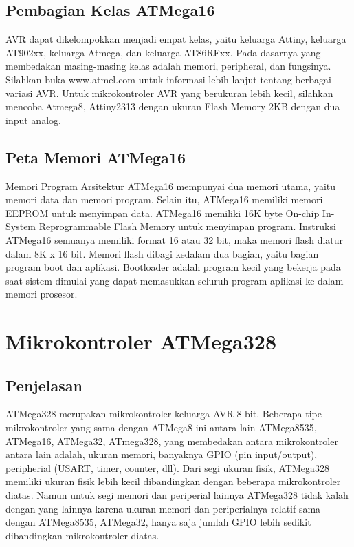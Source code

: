 	\subsection{Pembagian Kelas ATMega16}
		AVR dapat dikelompokkan menjadi empat kelas, yaitu keluarga Attiny, keluarga AT902xx, keluarga Atmega, dan keluarga AT86RFxx. Pada dasarnya yang membedakan masing-masing kelas adalah memori, peripheral, dan fungsinya. Silahkan buka www.atmel.com untuk informasi lebih lanjut tentang berbagai variasi AVR. Untuk mikrokontroler AVR yang berukuran lebih kecil, silahkan mencoba Atmega8, Attiny2313 dengan ukuran Flash Memory 2KB dengan dua input analog.
	\subsection{Peta Memori ATMega16}
		Memori Program    Arsitektur ATMega16 mempunyai dua memori utama, yaitu memori data dan memori program.  Selain itu, ATMega16 memiliki memori EEPROM untuk menyimpan data.  ATMega16 memiliki 16K byte On-chip In-System Reprogrammable Flash Memory untuk menyimpan program.  Instruksi ATMega16 semuanya memiliki format 16 atau 32 bit, maka memori flash diatur dalam 8K x 16 bit.  Memori flash dibagi kedalam dua bagian, yaitu bagian program boot dan aplikasi. Bootloader adalah program kecil yang bekerja pada saat sistem dimulai yang dapat memasukkan seluruh program aplikasi ke dalam memori prosesor.

\section{Mikrokontroler ATMega328}
	\subsection{Penjelasan}
	ATMega328 merupakan mikrokontroler keluarga AVR 8 bit. Beberapa tipe mikrokontroler yang sama dengan ATMega8 ini antara lain ATMega8535, ATMega16, ATMega32, ATmega328, yang membedakan antara mikrokontroler antara lain adalah, ukuran memori, banyaknya GPIO (pin input/output), peripherial (USART, timer, counter, dll). Dari segi ukuran fisik, ATMega328 memiliki ukuran fisik lebih kecil dibandingkan dengan beberapa mikrokontroler diatas. Namun untuk segi memori dan periperial lainnya ATMega328 tidak kalah dengan yang lainnya karena ukuran memori dan periperialnya relatif sama dengan ATMega8535, ATMega32, hanya saja jumlah GPIO lebih sedikit dibandingkan mikrokontroler diatas.

